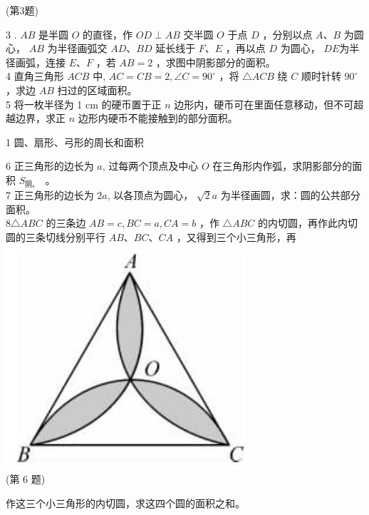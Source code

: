 \documentclass[10pt]{article}
\begin{document}
\begin{enumerate}
(第3题)
\end{enumerate}

3 . $A B$ 是半圆 $O$ 的直径，作 $O D \perp A B$ 交半圆 $O$ 于点 $D$ ，分别以点 $A 、 B$ 为圆心， $A B$ 为半径画弧交 $A D 、 B D$ 延长线于 $F 、 E$ ，再以点 $D$ 为圆心， $D E$为半径画弧，连接 $E 、 F$ ，若 $A B=2$ ，求图中阴影部分的面积。\\
4 直角三角形 $A C B$ 中, $A C=C B=2, \angle C=90^{\circ}$ ，将 $\triangle A C B$ 绕 $C$ 顺时针转 $90^{\circ}$ ，求边 $A B$ 扫过的区域面积。\\
5 将一枚半径为 1 cm 的硬币置于正 $n$ 边形内，硬币可在里面任意移动，但不可超越边界，求正 $n$ 边形内硬币不能接触到的部分面积。

1 圆、扇形、弓形的周长和面积

6 正三角形的边长为 $a$, 过每两个顶点及中心 $O$ 在三角形内作弧，求阴影部分的面积 $S_{\text {阴。 }}$ 。\\
7 正三角形的边长为 $2 a$, 以各顶点为圆心， $\sqrt{2} a$ 为半径画圆，求：圆的公共部分面积。\\
$8 \triangle A B C$ 的三条边 $A B=c, B C=a, C A=b$ ，作 $\triangle A B C$ 的内切圆，再作此内切圆的三条切线分别平行 $A B 、 B C 、 C A$ ，又得到三个小三角形，再\\
\includegraphics[max width=\textwidth, center]{2024_10_30_66b8e5e701da2093c133g-016}\\
(第 6 题)

作这三个小三角形的内切圆，求这四个圆的面积之和。
\end{document}
